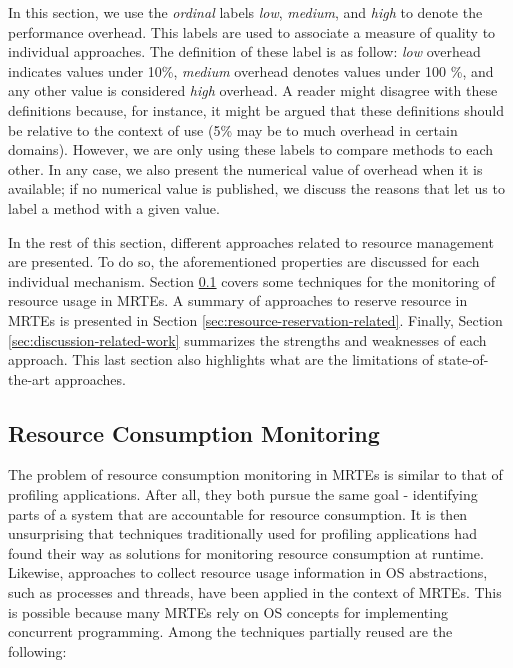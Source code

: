 \begin{itemize}
In this section, we use the \textit{ordinal} labels \textit{low}, \textit{medium}, and \textit{high} to denote the performance overhead.
This labels are used to associate a measure of quality to individual approaches. 
The definition of these label is as follow: \textit{low} overhead indicates values under 10\%, \textit{medium} overhead denotes values under 100 \%, and any other value is considered \textit{high} overhead.
A reader might disagree with these definitions because, for instance, it might be argued that these definitions should be relative to the context of use (5\% may be to much overhead in certain domains).
However, we are only using these labels to compare methods to each other.
In any case, we also present the numerical value of overhead when it is available; if no numerical value is published, we discuss the reasons that let us to label a method with a given value.


\end{itemize}

In the rest of this section, different approaches related to resource management are presented.
To do so, the aforementioned properties are discussed for each individual mechanism.
Section \ref{sec:resource-consumption-monitoring-related} covers some techniques for the monitoring of resource usage in MRTEs.
A summary of approaches to reserve resource in MRTEs is presented in Section \ref{sec:resource-reservation-related}.
Finally, Section \ref{sec:discussion-related-work} summarizes the strengths and weaknesses of each approach.
This last section also highlights what are the limitations of state-of-the-art approaches.

\subsection{Resource Consumption Monitoring} \label{sec:resource-consumption-monitoring-related}

The problem of resource consumption monitoring in MRTEs is similar to that of profiling applications.
After all, they both pursue the same goal - identifying parts of a system that are accountable for resource consumption.
It is then unsurprising that techniques traditionally used for profiling applications had found their way as solutions for monitoring resource consumption at runtime.
Likewise, approaches to collect resource usage information in OS abstractions, such as processes and threads, have been applied in the context of MRTEs.
This is possible because many MRTEs rely on OS concepts for implementing concurrent programming.
Among the techniques partially reused are the following:


